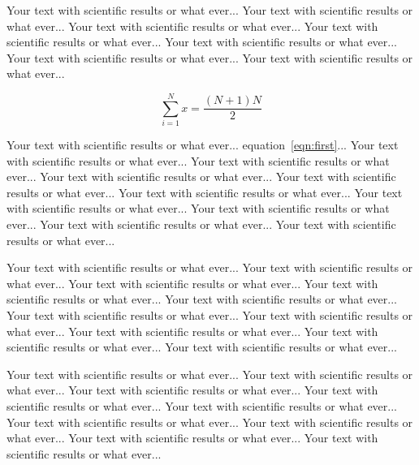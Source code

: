 \documentclass[landscape,a0b,final]{a0poster}
\newenvironment{poster}{
  \begin{center}
  \begin{minipage}[c]{0.98\textwidth}
}{
  \end{minipage} 
  \end{center}
}
\newcommand{\pbox}[4]{
\psshadowbox[#3]{
\begin{minipage}[t][#2][t]{#1}
#4
\end{minipage}
}}
\begin{document}
\begin{poster}
\begin{multicols}{3}
Your text with scientific results or what ever... Your text with
scientific results or what ever... Your text with scientific results or
what ever... Your text with scientific results or what ever... Your
text with scientific results or what ever... Your text with scientific
results or what ever... Your text with scientific results or what
ever...

\begin{equation}\label{eqn:first}
  \sum_{i=1}^{N} x = \frac{(N+1)N}{2}
\end{equation}

Your text with scientific results or what ever...
equation~\ref{eqn:first}... Your text with scientific results or what
ever... Your text with scientific results or what ever... Your text
with scientific results or what ever... Your text with scientific
results or what ever... Your text with scientific results or what
ever... Your text with scientific results or what ever... Your text
with scientific results or what ever... Your text with scientific
results or what ever... Your text with scientific results or what
ever...

\vspace{2cm}\begin{center}\pbox{0.8\columnwidth}{}{linewidth=2mm,framearc=0.1,linecolor=lightblue,fillstyle=gradient,gradangle=0,gradbegin=white,gradend=whiteblue,gradmidpoint=1.0,framesep=1em}{\begin{center}Section\end{center}}\end{center}\vspace{1.25cm}

\cite{Aut2001} Your
text with scientific results or what ever... Your text with scientific
results or what ever... Your text with scientific results or what
ever... Your text with scientific results or what ever... Your text
with scientific results or what ever... Your text with scientific
results or what ever... Your text with scientific results or what
ever... Your text with scientific results or what ever... Your text
with scientific results or what ever... Your text with scientific
results or what ever...

Your text with scientific results or what ever... Your text with
scientific results or what ever... Your text with scientific results or
what ever... Your text with scientific results or what ever... Your
text with scientific results or what ever... Your text with scientific
results or what ever... Your text with scientific results or what
ever... Your text with scientific results or what ever... Your text
with scientific results or what ever...


\end{multicols}
\end{poster}
\end{document}
